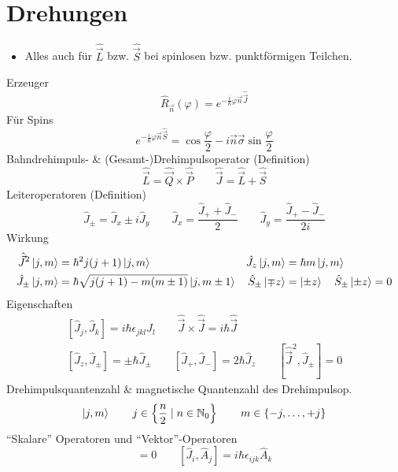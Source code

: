 \section{Drehungen}

\begin{itemize}
    \item Alles auch für $\hat{\vec{L}}$ bzw. $\hat{\vec{S}}$ bei spinlosen bzw. punktförmigen Teilchen. \cite[S. 202f]{qm}
\end{itemize}
Erzeuger \cite[Glg. 6.22]{qm}
\begin{equation*}
    \hat{R}_{\vec{n}}(\varphi) = e^{-\frac{i}{\hbar}\varphi \vec{n} \hat{\vec{J}}}
\end{equation*}
Für Spins \cite[Glg. 6.23]{qm}
\begin{equation*}
	e^{-\frac{i}{\hbar}\varphi\vec{n}\hat{\vec{S}}} = \cos\frac{\varphi}{2}-i\vec{n}\vec{\sigma}\sin\frac{\varphi}{2}
\end{equation*}
Bahndrehimpuls- \& (Gesamt-)Drehimpulsoperator (Definition) \cite[Glg. 6.29, 6.30]{qm}
\begin{equation*}
    \hat{\vec{L}} = \hat{\vec{Q}} \times \hat{\vec{P}} \qquad \hat{\vec{J}} = \hat{\vec{L}} + \hat{\vec{S}}
\end{equation*}
Leiteroperatoren (Definition) \cite[Glg. 6.35]{qm}
\begin{equation*}
    \hat{J}_\pm = \hat{J}_x \pm i \hat{J}_y \qquad \hat{J}_x = \frac{\hat{J}_+ + \hat{J}_-}{2} \qquad \hat{J}_y = \frac{\hat{J}_+ - \hat{J}_-}{2i}
\end{equation*}
Wirkung \cite[Glg. 6.52, 6.57, 6.41]{qm}
\begin{align*}
	\hat{\vec{J}}^2\ket{j, m} &= \hbar^2j(j+1)\ket{j,m} & \hat{J}_z\ket{j, m} &= \hbar m\ket{j,m} \\
	\hat{J}_\pm\ket{j, m} &= \hbar\sqrt{j(j+1)-m(m\pm 1)}\ket{j,m\pm 1} & \hat{S}_\pm\ket{\mp z}&=\ket{\pm z} \quad \hat{S}_\pm\ket{\pm z}=0
\end{align*}
Eigenschaften \cite[Glg. 6.31, 6.32, 6.36]{qm}
\begin{gather*}
	\left[\hat{J}_j, \hat{J}_k\right] = i\hbar \epsilon_{jkl} \hat{J}_l \qquad \hat{\vec{J}} \times \hat{\vec{J}} = i\hbar \hat{\vec{J}} \\
	\left[ \hat{J}_z, \hat{J}_\pm \right] = \pm \hbar \hat{J}_\pm \qquad \left[ \hat{J}_+, \hat{J}_- \right] = 2\hbar \hat{J}_z \qquad \left[ \hat{\vec{J}}^2, \hat{J}_\pm \right] = 0
\end{gather*}
Drehimpulsquantenzahl \& magnetische Quantenzahl des Drehimpulsop. \cite[Tab. 6.1]{qm}
\begin{equation*}
    \ket{j,m} \qquad j\in\left\{\frac{n}{2}\mid n\in\mathbb{N}_0\right\} \qquad m\in\left\{-j,\dots,+j\right\}
\end{equation*}
``Skalare'' Operatoren und ``Vektor''-Operatoren \cite[Glg. 6.33, 6.34]{qm}
\begin{equation*}
	[\hat{\vec{J}},\hat{A}]=0 \qquad [\hat{J}_i,\hat{A}_j]=i\hbar\epsilon_{ijk}\hat{A}_k
\end{equation*}
